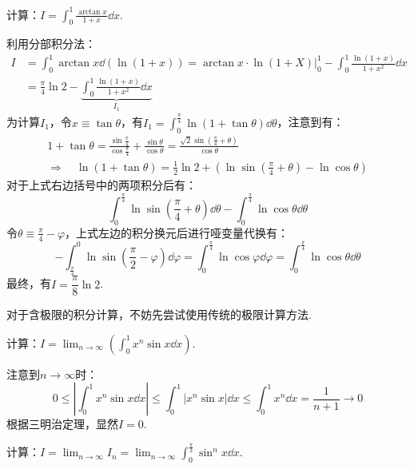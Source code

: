 \begin{question}
    计算：$\displaystyle I = \int_{0}^{1}\frac{\arctan x}{1+x}\dd{x}$.
\end{question}

\begin{solution}
    利用分部积分法：
    \begin{align*}
        I &= \int_{0}^{1}\arctan x \dd{(\ln(1+x))} = \arctan x \cdot \ln(1+X)\Big|_0^1 - \int_{0}^{1}\frac{\ln(1+x)}{1+x^2}\dd{x}\\
        &= \frac{\pi}{4}\ln 2 - \underbrace{\int_{0}^{1}\frac{\ln(1+x)}{1+x^2}\dd{x}}_{I_1}
    \end{align*}
    为计算$I_1$，令$x \equiv \tan\theta$，有$\displaystyle I_1 = \int_{0}^{\frac{\pi}{4}}\ln(1+\tan\theta)\dd{\theta}$，注意到有：
    \begin{gather*}
        1+\tan\theta = \frac{\sin\frac{\pi}{4}}{\cos\frac{\pi}{4}} + \frac{\sin\theta}{\cos\theta} = \frac{\sqrt{2}\sin\left(\frac{\pi}{4}+\theta\right)}{\cos\theta}\\
        \Rightarrow\quad \ln(1+\tan\theta) = \frac{1}{2}\ln 2 + \left(\ln\sin\left(\frac{\pi}{4}+\theta\right) - \ln\cos\theta\right)
    \end{gather*}
    对于上式右边括号中的两项积分后有：
    \[\int_{0}^{\frac{\pi}{4}}\ln\sin\left(\frac{\pi}{4}+\theta\right)\dd{\theta} - \int_{0}^{\frac{\pi}{4}}\ln\cos\theta\dd{\theta}\]
    令$\theta\equiv\frac{\pi}{4}-\varphi$，上式左边的积分换元后进行哑变量代换有：
    \[-\int_{\frac{\pi}{4}}^{0}\ln\sin\left(\frac{\pi}{2}-\varphi\right)\dd{\varphi} = \int_{0}^{\frac{\pi}{4}}\ln\cos\varphi\dd{\varphi} = \int_{0}^{\frac{\pi}{4}}\ln\cos\theta\dd{\theta}\]
    最终，有$I = \dfrac{\pi}{8}\ln 2$.
\end{solution}

对于含极限的积分计算，不妨先尝试使用传统的极限计算方法.

\begin{question}
    计算：$\displaystyle I = \lim_{n\to\infty}\left(\int_{0}^{1} x^n \sin x \dd{x}\right)$.
\end{question}

\begin{solution}
    注意到$n\to\infty$时：
    \[0 \leqslant \left|\int_{0}^{1} x^n \sin x \dd{x}\right| \leqslant \int_{0}^{1}|x^n \sin x|\dd{x} \leqslant\int_{0}^{1}x^n\dd{x} = \frac{1}{n+1} \to 0\]
    根据三明治定理，显然$I=0$.
\end{solution}

\begin{question}
    计算：$\displaystyle I = \lim_{n\to\infty}I_n = \lim_{n\to\infty}\int_{0}^{\frac{\pi}{2}}\sin^n x\dd{x}$.
\end{question}


